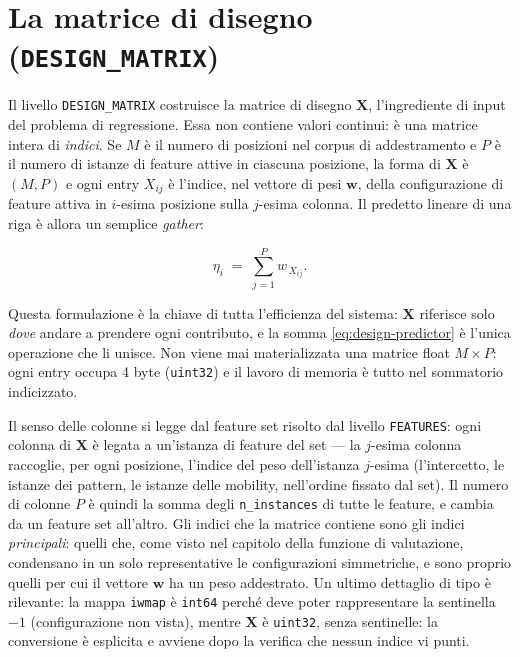 \section{La matrice di disegno (\texttt{DESIGN\_MATRIX})}

Il livello \texttt{DESIGN\_MATRIX} costruisce la matrice di disegno $\bm{X}$,
l'ingrediente di input del problema di regressione. Essa non contiene valori
continui: è una matrice intera di \emph{indici}. Se $M$ è il numero di
posizioni nel corpus di addestramento e $P$ è il numero di istanze di feature
attive in ciascuna posizione, la forma di $\bm{X}$ è $(M, P)$ e ogni entry
$X_{ij}$ è l'indice, nel vettore di pesi $\bm{w}$, della configurazione di
feature attiva in $i$-esima posizione sulla $j$-esima colonna. Il predetto
lineare di una riga è allora un semplice \emph{gather}:

\begin{equation}
  \eta_i \;=\; \sum_{j=1}^{P} w_{\,X_{ij}} .
  \label{eq:design-predictor}
\end{equation}

Questa formulazione è la chiave di tutta l'efficienza del sistema: $\bm{X}$
riferisce solo \emph{dove} andare a prendere ogni contributo, e la somma
\eqref{eq:design-predictor} è l'unica operazione che li unisce. Non viene mai
materializzata una matrice float $M \times P$: ogni entry occupa 4 byte
(\texttt{uint32}) e il lavoro di memoria è tutto nel sommatorio indicizzato.

Il senso delle colonne si legge dal feature set risolto dal livello
\texttt{FEATURES}: ogni colonna di $\bm{X}$ è legata a un'istanza di feature
del set — la $j$-esima colonna raccoglie, per ogni posizione, l'indice del
peso dell'istanza $j$-esima (l'intercetto, le istanze dei pattern, le
istanze delle mobility, nell'ordine fissato dal set). Il numero di colonne
$P$ è quindi la somma degli \texttt{n\_instances} di tutte le feature, e
cambia da un feature set all'altro. Gli indici che la matrice contiene sono
gli indici \emph{principali}: quelli che, come visto nel capitolo della
funzione di valutazione, condensano in un solo representative le
configurazioni simmetriche, e sono proprio quelli per cui il vettore $\bm{w}$
ha un peso addestrato. Un ultimo dettaglio di tipo è rilevante: la mappa
\texttt{iwmap} è \texttt{int64} perché deve poter rappresentare la sentinella
$-1$ (configurazione non vista), mentre $\bm{X}$ è \texttt{uint32}, senza
sentinelle: la conversione è esplicita e avviene dopo la verifica che nessun
indice vi punti.

